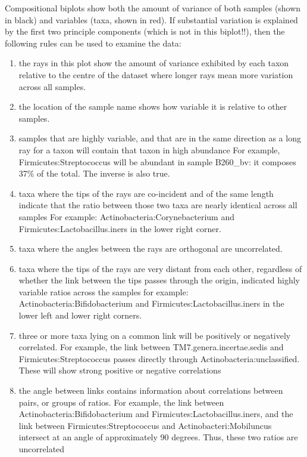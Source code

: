 \documentclass[11pt]{article}\usepackage[]{graphicx}\usepackage[]{color}
\begin{document}
Compositional biplots show both the amount of variance of both samples (shown in black) and variables (taxa, shown in red).  If substantial variation is explained by the first two principle components (which is not in this biplot!!), then the following rules can be used to examine the data:

\begin{enumerate}

\item the rays in this plot show the amount of variance exhibited by each taxon relative to the centre of the dataset where longer rays mean more variation across all samples.

\item the location of the sample name shows how variable it is relative to other samples.

\item samples that are highly variable, and that are in the same direction as a long ray for a taxon will contain that taxon in high abundance For example, Firmicutes:Streptococcus will be abundant in sample B260\_bv: it composes 37\% of the total. The inverse is also true.

\item taxa where the tips of the rays are co-incident and of the same length indicate that the ratio between those two taxa are nearly identical across all samples For example: Actinobacteria:Corynebacterium and Firmicutes:Lactobacillus.iners in the lower right corner.

\item taxa where the angles between the rays are orthogonal are uncorrelated.

\item taxa where the tips of the rays are very distant from each other, regardless of whether the link between the tips passes through the origin, indicated highly variable ratios across the samples for example: Actinobacteria:Bifidobacterium and Firmicutes:Lactobacillus.iners in the lower left and lower right corners.

\item three or more taxa lying on a common link will be positively or negatively correlated. For example, the link between TM7.genera.incertae.sedis and Firmicutes:Streptococcus passes directly through Actinobacteria:unclassified. These will show strong positive or negative correlations

\item the angle between links contains information about correlations between pairs, or groups of ratios. For example, the link between Actinobacteria:Bifidobacterium and Firmicutes:Lactobacillus.iners, and the link between Firmicutes:Streptococcus and Actinobacteri:Mobiluncus intersect at an angle of approximately 90 degrees. Thus, these two ratios are uncorrelated 

\end{enumerate} 
\end{document}
